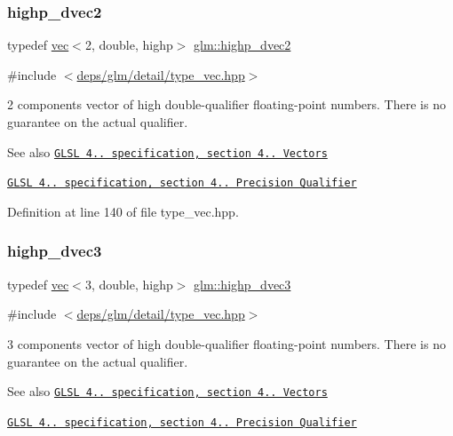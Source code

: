 \subsubsection{\texorpdfstring{highp\+\_\+dvec2}{highp\_dvec2}}
{\footnotesize\ttfamily typedef \hyperlink{structglm_1_1vec}{vec}$<$2, double, highp$>$ \hyperlink{group__core__precision_gadec51e8e57b72d8fc95e87f18d1ad4dd}{glm\+::highp\+\_\+dvec2}}



{\ttfamily \#include $<$\hyperlink{type__vec_8hpp}{deps/glm/detail/type\+\_\+vec.\+hpp}$>$}

2 components vector of high double-\/qualifier floating-\/point numbers. There is no guarantee on the actual qualifier.

\begin{DoxySeeAlso}{See also}
\href{http://www.opengl.org/registry/doc/GLSLangSpec.4.20.8.pdf}{\tt G\+L\+SL 4.. specification, section 4.. Vectors} 

\href{http://www.opengl.org/registry/doc/GLSLangSpec.4.20.8.pdf}{\tt G\+L\+SL 4.. specification, section 4.. Precision Qualifier} 
\end{DoxySeeAlso}


Definition at line 140 of file type\+\_\+vec.\+hpp.

\mbox{\label{group__core__precision_ga63f89fa26f599ac15428c9d1a70a5467}} 
\subsubsection{\texorpdfstring{highp\+\_\+dvec3}{highp\_dvec3}}
{\footnotesize\ttfamily typedef \hyperlink{structglm_1_1vec}{vec}$<$3, double, highp$>$ \hyperlink{group__core__precision_ga63f89fa26f599ac15428c9d1a70a5467}{glm\+::highp\+\_\+dvec3}}



{\ttfamily \#include $<$\hyperlink{type__vec_8hpp}{deps/glm/detail/type\+\_\+vec.\+hpp}$>$}

3 components vector of high double-\/qualifier floating-\/point numbers. There is no guarantee on the actual qualifier.

\begin{DoxySeeAlso}{See also}
\href{http://www.opengl.org/registry/doc/GLSLangSpec.4.20.8.pdf}{\tt G\+L\+SL 4.. specification, section 4.. Vectors} 

\href{http://www.opengl.org/registry/doc/GLSLangSpec.4.20.8.pdf}{\tt G\+L\+SL 4.. specification, section 4.. Precision Qualifier} 
\end{DoxySeeAlso}


